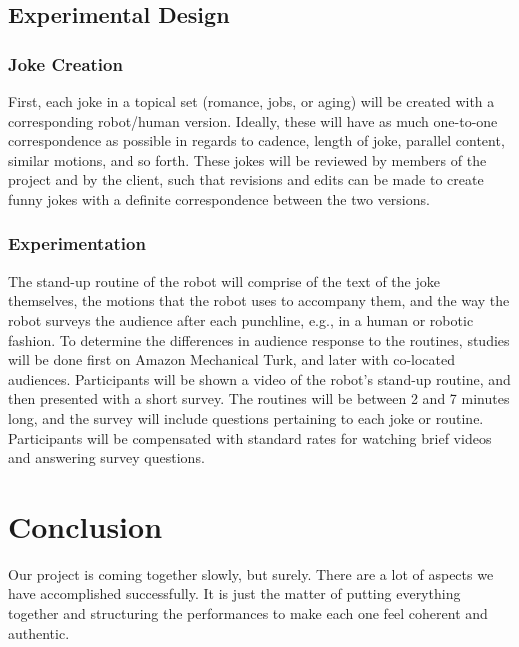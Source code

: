 \documentclass[onecolumn, draftclsnofoot,10pt, compsoc]{IEEEtran}
\begin{document}
\subsection{Experimental Design}

\subsubsection{Joke Creation}
First, each joke in a topical set (romance, jobs, or aging) will be created with a corresponding robot/human version.
Ideally, these will have as much one-to-one correspondence as possible in regards to cadence, length of joke, parallel content, similar motions, and so forth.
These jokes will be reviewed by members of the project and by the client, such that revisions and edits can be made to create funny jokes with a definite correspondence between the two versions.

\subsubsection{Experimentation}
The stand-up routine of the robot will comprise of the text of the joke themselves, the motions that the robot uses to accompany them, and the way the robot surveys the audience after each punchline, e.g., in a human or robotic fashion.
To determine the differences in audience response to the routines, studies will be done first on Amazon Mechanical Turk, and later with co-located audiences.
Participants will be shown a video of the robot's stand-up routine, and then presented with a short survey.
The routines will be between 2 and 7 minutes long, and the survey will include questions pertaining to each joke or routine.
Participants will be compensated with standard rates for watching brief videos and answering survey questions.


\section{Conclusion}

Our project is coming together slowly, but surely. There are a lot of aspects we have accomplished successfully. It is just the matter of putting everything together and structuring the performances to make each one feel coherent and authentic.

\pagebreak


% 
% 
\end{document}
